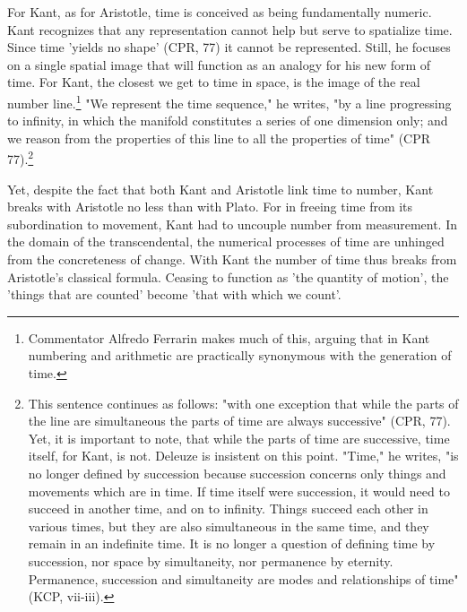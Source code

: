 For Kant, as for Aristotle, time is conceived as being fundamentally numeric. Kant recognizes that any representation cannot help but serve to spatialize time. Since time 'yields no shape' (CPR, 77) it cannot be represented. Still, he focuses on a single spatial image that will function as an analogy for his new form of time. For Kant, the closest we get to time in space, is the image of the real number line.\footnote{Commentator Alfredo Ferrarin makes much of this, arguing that in Kant numbering and arithmetic are practically synonymous with the generation of time.} "We represent the time sequence," he writes, "by a line progressing to infinity, in which the manifold constitutes a series of one dimension only; and we reason from the properties of this line to all the properties of time" (CPR 77).\footnote{This sentence continues as follows: "with one exception that while the parts of the line are simultaneous the parts of time are always successive" (CPR, 77). Yet, it is important to note, that while the parts of time are successive, time itself, for Kant, is not. Deleuze is insistent on this point. "Time," he writes, "is no longer defined by succession because succession concerns only things and movements which are in time. If time itself were succession, it would need to succeed in another time, and on to infinity. Things succeed each other in various times, but they are also simultaneous in the same time, and they remain in an indefinite time. It is no longer a question of defining time by succession, nor space by simultaneity, nor permanence by eternity. Permanence, succession and simultaneity are modes and relationships of time" (KCP, vii-iii).}

Yet, despite the fact that both Kant and Aristotle link time to number, Kant breaks with Aristotle no less than with Plato. For in freeing time from its subordination to movement, Kant had to uncouple number from measurement. In the domain of the transcendental, the numerical processes of time are unhinged from the concreteness of change. With Kant the number of time thus breaks from Aristotle's classical formula. Ceasing to function as 'the quantity of motion', the 'things that are counted' become 'that with
which we count'. 

